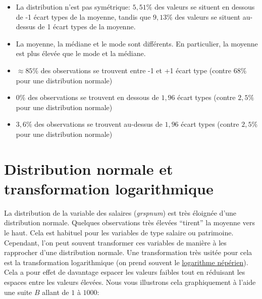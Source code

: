 \documentclass[
]{book}
\providecommand{\tightlist}{%
  \setlength{\itemsep}{0pt}\setlength{\parskip}{0pt}}
\begin{document}
\begin{itemize}
\tightlist
\item
  La distribution n'est pas symétrique: \(5,51\%\) des valeurs se situent en dessous de -1 écart types de la moyenne, tandis que \(9,13\%\) des valeurs se situent au-dessus de 1 écart types de la moyenne.
\item
  La moyenne, la médiane et le mode sont différents. En particulier, la moyenne est plus élevée que le mode et la médiane.
\item
  \(\approx85\%\) des observations se trouvent entre -1 et +1 écart type (contre \(68\%\) pour une distribution normale)
\item
  \(0\%\) des observations se trouvent en dessous de \(1,96\) écart types (contre \(2,5\%\) pour une distribution normale)
\item
  \(3,6\%\) des observations se trouvent au-dessus de \(1,96\) écart types (contre \(2,5\%\) pour une distribution normale)
\end{itemize}

\hypertarget{trans_log_grspnum}{%
\section{Distribution normale et transformation logarithmique}\label{trans_log_grspnum}}

La distribution de la variable des salaires (\emph{grspnum}) est très éloignée d'une distribution normale. Quelques observations très élevées ``tirent'' la moyenne vers le haut. Cela est habituel pour les variables de type salaire ou patrimoine. Cependant, l'on peut souvent transformer ces variables de manière à les rapprocher d'une distribution normale. Une transformation très usitée pour cela est la transformation logarithmique (on prend souvent le \href{https://fr.wikipedia.org/wiki/Logarithme_naturel}{logarithme népérien}). Cela a pour effet de davantage espacer les valeurs faibles tout en réduisant les espaces entre les valeurs élevées. Nous vous illustrons cela graphiquement à l'aide une suite \(B\) allant de \(1\) à \(1000\):
\end{document}
